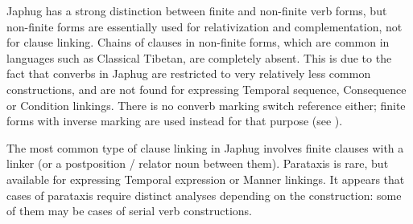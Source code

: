 \documentclass[oldfontcommands,oneside,a4paper,11pt]{article}
\begin{document}
Japhug has a strong distinction between finite and non-finite verb forms, but non-finite forms are essentially used for relativization and complementation, not for clause linking. Chains of clauses in non-finite forms, which are common in languages such as Classical Tibetan, are completely absent. This is due to the fact that converbs in Japhug are restricted to very relatively less common constructions, and are not found for expressing  Temporal sequence, Consequence or Condition linkings. There is no converb marking switch reference either; finite forms with inverse marking are used instead for that purpose (see \citealt{jacques10inverse}).

The most common type of clause linking in Japhug involves finite clauses with  a linker (or a postposition / relator noun between them). Parataxis is rare, but available for expressing Temporal expression or Manner linkings. It appears that cases of parataxis require distinct analyses depending on the construction: some of them may be cases of serial verb constructions.



\end{document}
